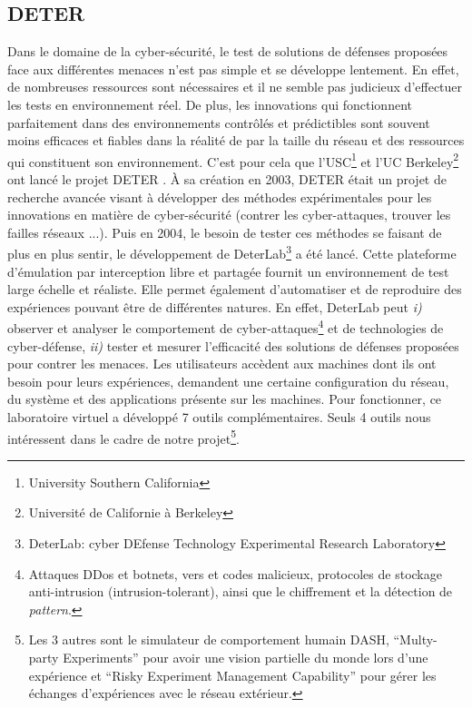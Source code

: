 \subsection{DETER}
\label{subsection:DETER}

Dans le domaine de la cyber-sécurité, le test de solutions de défenses proposées
face aux différentes menaces n'est pas simple et se développe lentement. En
effet, de nombreuses ressources sont nécessaires et il ne semble pas judicieux
d'effectuer les tests en environnement réel. De plus, les innovations qui
fonctionnent parfaitement dans des environnements contrôlés et prédictibles
sont souvent moins efficaces et fiables dans la réalité de par la taille du
réseau et des ressources qui constituent son environnement.  C'est pour cela que
l'USC\footnote{University Southern California} et l'UC
Berkeley\footnote{Université de Californie à Berkeley} ont lancé le projet DETER
\citep{DETER_Project, DETER_benzel2011science, DETER_mirkovic2010deter}. À sa
création en 2003, DETER était un projet de recherche avancée visant à
développer des méthodes expérimentales pour les innovations en matière de
cyber-sécurité (contrer les cyber-attaques, trouver les failles réseaux
...). Puis en 2004, le besoin de tester ces méthodes se faisant de plus en plus
sentir, le développement de DeterLab\footnote{DeterLab: cyber DEfense Technology
  Experimental Research Laboratory} a été lancé. Cette plateforme d'émulation
par interception libre et partagée fournit un environnement de test large
échelle et réaliste. Elle permet également d'automatiser et de reproduire des
expériences pouvant être de différentes natures. En effet, DeterLab peut
\textit{i)} observer et analyser le comportement de cyber-attaques\footnote{
  Attaques DDos et botnets, vers et codes malicieux, protocoles de stockage
  anti-intrusion (intrusion-tolerant), ainsi que le chiffrement et la détection
  de \textit{pattern}.} et de technologies de cyber-défense, \textit{ii)} tester et
mesurer l'efficacité des solutions de défenses proposées pour contrer les
menaces. Les utilisateurs accèdent aux machines dont ils ont besoin pour leurs
expériences, demandent une certaine configuration du réseau, du système et des
applications présente sur les machines. Pour fonctionner, ce laboratoire virtuel a
développé 7 outils complémentaires. Seuls 4 outils nous intéressent dans le cadre de notre projet\footnote{Les 3 autres sont le simulateur de comportement humain DASH, ``Multy-party Experiments'' pour avoir une vision partielle du monde lors d'une expérience et ``Risky Experiment Management Capability'' pour gérer les échanges d'expériences avec le réseau extérieur.}.

